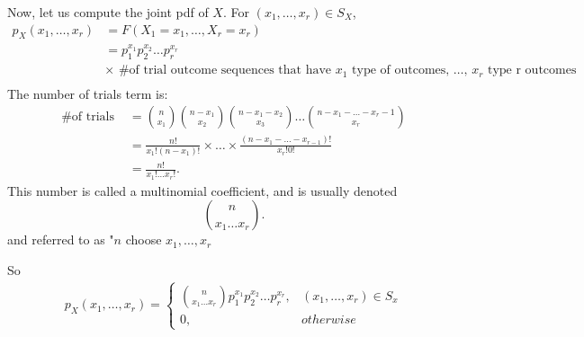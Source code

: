 Now, let us compute the joint pdf of $X$. For $\left( x_{1} , \ldots , x_{r} \right) \in  S_{X}$,
\begin{align*}
	p_{X}\left( x_{1} , \ldots , x_{r} \right)  &=  F\left( X_1 = x_1, \ldots, X_{r} = x_{r} \right)  \\
	&= p_1 ^{x_1} p_2 ^{x_2}\ldots p_r ^{x_r} \\
	&\times \text{ \# of trial outcome sequences that have $x_1$ type of outcomes, \ldots, $x_{r}$ type r outcomes} \\
\end{align*}
The number of trials term is:
\begin{align*}
	\text{\# of trials }&= \binom{n}{x_1}\binom{n - x_1}{x_2}\binom{n - x_1 - x_2}{x_3} \ldots \binom{n - x_1 - \ldots - x_r - 1}{x_{r}} \\
			    &= \frac{n!}{x_1 ! \left( n - x_1 \right) ! } \times \ldots \times  \frac{\left( n - x_1 - \ldots - x_{r - 1} \right) ! }{x_{r}! 0 !} \\
			    &= \frac{n!}{x_1 ! \ldots x_{r}!}
.\end{align*}
This number is called a multinomial coefficient, and is usually denoted 
\[
\binom{n}{x_{1}  \ldots  x_{r}}
.\] 
and referred to as "$n$ choose $x_{1} , \ldots , x_{r}$

So
\begin{align*}
	p_{X}\left( x_{1} , \ldots , x_{r} \right) = \begin{cases}
		\binom{n }{x_1 \ldots x_{r}} p_1 ^{x_1} p_2 ^{x_2}\ldots p_r ^{x_r}, & \left( x_{1} , \ldots , x_{r} \right) \in S_{x} \\
		0, & otherwise
	\end{cases}
\end{align*}
